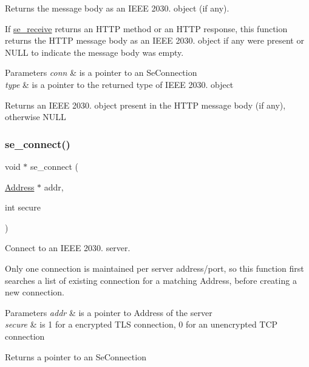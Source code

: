 Returns the message body as an I\+E\+EE 2030. object (if any). 

If \hyperlink{group__se__connection_ga4d041c447020f6ba4d310facc21f1776}{se\+\_\+receive} returns an H\+T\+TP method or an H\+T\+TP response, this function returns the H\+T\+TP message body as an I\+E\+EE 2030. object if any were present or N\+U\+LL to indicate the message body was empty. 
\begin{DoxyParams}{Parameters}
{\em conn} & is a pointer to an Se\+Connection \\
\hline
{\em type} & is a pointer to the returned type of I\+E\+EE 2030. object \\
\hline
\end{DoxyParams}
\begin{DoxyReturn}{Returns}
an I\+E\+EE 2030. object present in the H\+T\+TP message body (if any), otherwise N\+U\+LL 
\end{DoxyReturn}
\mbox{\label{group__se__connection_ga46a034b6bbe2211018b10b0eba5d96be}} 
\subsubsection{\texorpdfstring{se\+\_\+connect()}{se\_connect()}}
{\footnotesize\ttfamily void $\ast$ se\+\_\+connect (\begin{DoxyParamCaption}\item[{\hyperlink{group__address_ga80f2dcdb3778441e85ac8c9dbb6f324a}{Address} $\ast$}]{addr,  }\item[{int}]{secure }\end{DoxyParamCaption})}



Connect to an I\+E\+EE 2030. server. 

Only one connection is maintained per server address/port, so this function first searches a list of existing connection for a matching Address, before creating a new connection. 
\begin{DoxyParams}{Parameters}
{\em addr} & is a pointer to Address of the server \\
\hline
{\em secure} & is 1 for a encrypted T\+LS connection, 0 for an unencrypted T\+CP connection \\
\hline
\end{DoxyParams}
\begin{DoxyReturn}{Returns}
a pointer to an Se\+Connection 
\end{DoxyReturn}
\mbox{\label{group__se__connection_gad174138f5dd085fa16adcdccf495083e}} 
